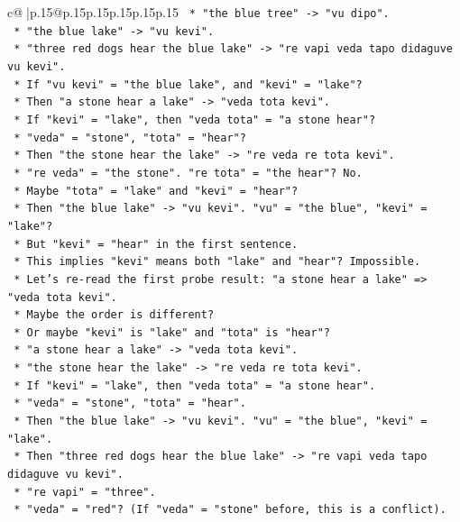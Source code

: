 \documentclass{article}
\begin{document}
{\begin{supertabular}{c@{$\;$}|p{.15\linewidth}@{}p{.15\linewidth}p{.15\linewidth}p{.15\linewidth}p{.15\linewidth}p{.15\linewidth}}
{{{\texttt{    *   "the blue tree" {-}> "vu dipo".} \\
\texttt{    *   "the blue lake" {-}> "vu kevi".} \\
\texttt{    *   "three red dogs hear the blue lake" {-}> "re vapi veda tapo didaguve vu kevi".} \\
\texttt{    *   If "vu kevi" = "the blue lake", and "kevi" = "lake"?} \\
\texttt{    *   Then "a stone hear a lake" {-}> "veda tota kevi".} \\
\texttt{    *   If "kevi" = "lake", then "veda tota" = "a stone hear"?} \\
\texttt{    *   "veda" = "stone", "tota" = "hear"?} \\
\texttt{    *   Then "the stone hear the lake" {-}> "re veda re tota kevi".} \\
\texttt{    *   "re veda" = "the stone". "re tota" = "the hear"? No.} \\
\texttt{    *   Maybe "tota" = "lake" and "kevi" = "hear"?} \\
\texttt{    *   Then "the blue lake" {-}> "vu kevi". "vu" = "the blue", "kevi" = "lake"?} \\
\texttt{    *   But "kevi" = "hear" in the first sentence.} \\
\texttt{    *   This implies "kevi" means both "lake" and "hear"? Impossible.} \\
\texttt{    *   Let's re{-}read the first probe result: "a stone hear a lake" => "veda tota kevi".} \\
\texttt{    *   Maybe the order is different?} \\
\texttt{    *   Or maybe "kevi" is "lake" and "tota" is "hear"?} \\
\texttt{    *   "a stone hear a lake" {-}> "veda tota kevi".} \\
\texttt{    *   "the stone hear the lake" {-}> "re veda re tota kevi".} \\
\texttt{    *   If "kevi" = "lake", then "veda tota" = "a stone hear".} \\
\texttt{    *   "veda" = "stone", "tota" = "hear".} \\
\texttt{    *   Then "the blue lake" {-}> "vu kevi". "vu" = "the blue", "kevi" = "lake".} \\
\texttt{    *   Then "three red dogs hear the blue lake" {-}> "re vapi veda tapo didaguve vu kevi".} \\
\texttt{    *   "re vapi" = "three".} \\
\texttt{    *   "veda" = "red"? (If "veda" = "stone" before, this is a conflict).} \\
}}}
\end{supertabular}}
\end{document}
